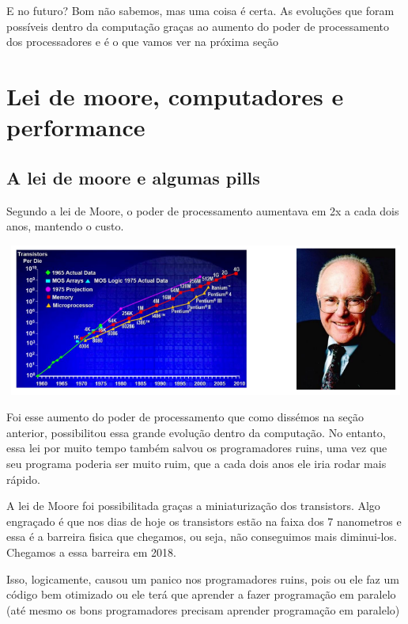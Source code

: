 \documentclass[12pt,a4paper]{report}
\begin{document}
	E no futuro? Bom não sabemos, mas uma coisa é certa. As evoluções que foram possíveis dentro da computação graças ao aumento do poder de processamento dos processadores e é o que vamos ver na próxima seção
	
	\section{Lei de moore, computadores e performance}
	
	\subsection{A lei de moore e algumas pills}
	
	Segundo a lei de Moore, o poder de processamento aumentava em 2x a cada dois anos, mantendo o custo.
	
	\begin{center}
		
		\includegraphics[width=14cm,height=5cm,keepaspectratio=false]{imagens-teoria/moore.png}
		
	\end{center}
	
	
	Foi esse aumento do poder de processamento que como dissémos na seção anterior, possibilitou essa grande evolução dentro da computação. No entanto, essa lei por muito tempo também salvou os programadores ruins, uma vez que seu programa poderia ser muito ruim, que a cada dois anos ele iria rodar mais rápido.
	
	A lei de Moore foi possibilitada graças a miniaturização dos transistors. Algo engraçado é que nos dias de hoje os transistors estão na faixa dos 7 nanometros e essa é a barreira fisica que chegamos, ou seja, não conseguimos mais diminui-los. Chegamos a essa barreira em 2018.
	
	Isso, logicamente, causou um panico nos programadores ruins, pois ou ele faz um código bem otimizado ou ele terá que aprender a fazer programação em paralelo (até mesmo os bons programadores precisam aprender programação em paralelo)
	
\end{document}
